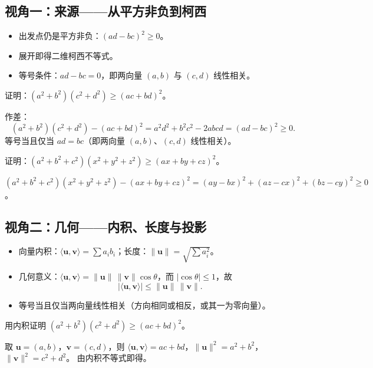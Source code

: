 \begin{explore}
\subsection{视角一：来源——从平方非负到柯西}

\begin{itemize}
  \item 出发点仍是平方非负：$(ad-bc)^2\geq0$。
  \item 展开即得二维柯西不等式。
  \item 等号条件：$ad-bc=0$，即两向量 $(a,b)$ 与 $(c,d)$ 线性相关。
\end{itemize}

\begin{example}
证明：$(a^2+b^2)(c^2+d^2)\geq(ac+bd)^2$。
\end{example}
\begin{solution}
作差：
\[
  (a^2+b^2)(c^2+d^2)-(ac+bd)^2
  =a^2d^2+b^2c^2-2abcd
  =(ad-bc)^2\geq0.
\]
等号当且仅当 $ad=bc$（即两向量 $(a,b)$、$(c,d)$ 线性相关）。
\end{solution}

\begin{problem}
证明：$(a^2+b^2+c^2)(x^2+y^2+z^2)\geq(ax+by+cz)^2$。
\end{problem}
\begin{solution}
$(a^2+b^2+c^2)(x^2+y^2+z^2)-(ax+by+cz)^2=(ay-bx)^2+(az-cx)^2+(bz-cy)^2\geq0$。
\end{solution}

\subsection{视角二：几何——内积、长度与投影}

\begin{itemize}
  \item 向量内积：$\langle\mathbf u,\mathbf v\rangle=\sum a_ib_i$；长度：$\|\mathbf u\|=\sqrt{\sum a_i^2}$。
  \item 几何意义：$\langle\mathbf u,\mathbf v\rangle=\|\mathbf u\|\,\|\mathbf v\|\cos\theta$，而 $|\cos\theta|\leq1$，故
  \[
    |\langle\mathbf u,\mathbf v\rangle|\leq\|\mathbf u\|\,\|\mathbf v\|.
  \]
  \item 等号当且仅当两向量线性相关（方向相同或相反，或其一为零向量）。
\end{itemize}

\begin{example}
用内积证明 $(a^2+b^2)(c^2+d^2)\geq(ac+bd)^2$。
\end{example}
\begin{solution}
取 $\mathbf u=(a,b)$，$\mathbf v=(c,d)$，则
$\langle\mathbf u,\mathbf v\rangle=ac+bd$，$\|\mathbf u\|^2=a^2+b^2$，$\|\mathbf v\|^2=c^2+d^2$。
由内积不等式即得。
\end{solution}


\end{explore}
